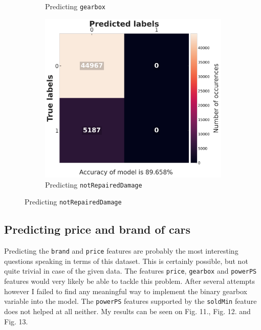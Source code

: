 \begin{figure}[h]
\begin{center}
\begin{subfigure}{0.32\textwidth}
			\caption{Predicting \texttt{gearbox}}
		\end{subfigure}
		\begin{subfigure}{0.32\textwidth}
			\includegraphics[width=0.99\linewidth]{./images/fig_14_ridge_notrepaired.png} 
			\caption{Predicting \texttt{notRepairedDamage}}
		\end{subfigure}
	\end{center}
\end{figure}

\subsection{Predicting price and brand of cars}
Predicting the \texttt{brand} and \texttt{price} features are probably the most interesting questions speaking in terms of this dataset. This is certainly possible, but not quite trivial in case of the given data. The features \texttt{price}, \texttt{gearbox} and \texttt{powerPS} features would very likely be able to tackle this problem. After several attempts however I failed to find any meaningful way to implement the binary gearbox variable into the model. The \texttt{powerPS} features supported by the \texttt{soldMin} feature does not helped at all neither. My results can be seen on Fig. 11., Fig. 12. and Fig. 13.

